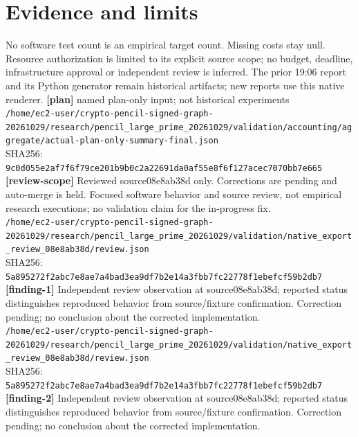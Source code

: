 \documentclass[11pt]{article}
\begin{document}
\section*{Evidence and limits}
No software test count is an empirical target count. Missing costs stay null. Resource authorization is limited to its explicit source scope; no budget, deadline, infrastructure approval or independent review is inferred. The prior 19:06 report and its Python generator remain historical artifacts; new reports use this native renderer.
\small
\textbf{[plan]} named plan-only input; not historical experiments\\
\texttt{/\allowbreak{}home/\allowbreak{}ec2-user/\allowbreak{}crypto-pencil-signed-graph-20261029/\allowbreak{}research/\allowbreak{}pencil\_large\_prime\_20261029/\allowbreak{}validation/\allowbreak{}accounting/\allowbreak{}aggregate/\allowbreak{}actual-plan-only-summary-final.json}\\
SHA256: \texttt{9c0d055e2af7f6f79ce201b9b0c2a22691da0af55e8f6f127acec7070bb7e665}\\
\textbf{[review-scope]} Reviewed source08e8ab38d only. Corrections are pending and auto-merge is held. Focused software behavior and source review, not empirical research executions; no validation claim for the in-progress fix.\\
\texttt{/\allowbreak{}home/\allowbreak{}ec2-user/\allowbreak{}crypto-pencil-signed-graph-20261029/\allowbreak{}research/\allowbreak{}pencil\_large\_prime\_20261029/\allowbreak{}validation/\allowbreak{}native\_export\_review\_08e8ab38d/\allowbreak{}review.json}\\
SHA256: \texttt{5a895272f2abc7e8ae7a4bad3ea9df7b2e14a3fbb7fc22778f1ebefcf59b2db7}\\
\textbf{[finding-1]} Independent review observation at source08e8ab38d; reported status distinguishes reproduced behavior from source/fixture confirmation. Correction pending; no conclusion about the corrected implementation.\\
\texttt{/\allowbreak{}home/\allowbreak{}ec2-user/\allowbreak{}crypto-pencil-signed-graph-20261029/\allowbreak{}research/\allowbreak{}pencil\_large\_prime\_20261029/\allowbreak{}validation/\allowbreak{}native\_export\_review\_08e8ab38d/\allowbreak{}review.json}\\
SHA256: \texttt{5a895272f2abc7e8ae7a4bad3ea9df7b2e14a3fbb7fc22778f1ebefcf59b2db7}\\
\textbf{[finding-2]} Independent review observation at source08e8ab38d; reported status distinguishes reproduced behavior from source/fixture confirmation. Correction pending; no conclusion about the corrected implementation.\\
\end{document}
